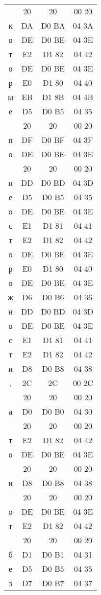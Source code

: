 \begin{center}
\begin{tabular}{|c|c|c|c|}
& 20 & 20 & 00 20\\
к & DA & D0 BA & 04 3A\\
о & DE & D0 BE & 04 3E\\
т & E2 & D1 82 & 04 42\\
о & DE & D0 BE & 04 3E\\
р & E0 & D1 80 & 04 40\\
ы & EB & D1 8B & 04 4B\\
е & D5 & D0 B5 & 04 35\\
& 20 & 20 & 00 20\\
п & DF & D0 BF & 04 3F\\
о & DE & D0 BE & 04 3E\\
& 20 & 20 & 00 20\\
н & DD & D0 BD & 04 3D\\
е & D5 & D0 B5 & 04 35\\
о & DE & D0 BE & 04 3E\\
с & E1 & D1 81 & 04 41\\
т & E2 & D1 82 & 04 42\\
о & DE & D0 BE & 04 3E\\
р & E0 & D1 80 & 04 40\\
о & DE & D0 BE & 04 3E\\
ж & D6 & D0 B6 & 04 36\\
н & DD & D0 BD & 04 3D\\
о & DE & D0 BE & 04 3E\\
с & E1 & D1 81 & 04 41\\
т & E2 & D1 82 & 04 42\\
и & D8 & D0 B8 & 04 38\\
, & 2C & 2C & 00 2C\\
& 20 & 20 & 00 20\\
а & D0 & D0 B0 & 04 30\\
& 20 & 20 & 00 20\\
т & E2 & D1 82 & 04 42\\
о & DE & D0 BE & 04 3E\\
& 20 & 20 & 00 20\\
и & D8 & D0 B8 & 04 38\\
& 20 & 20 & 00 20\\
о & DE & D0 BE & 04 3E\\
т & E2 & D1 82 & 04 42\\
& 20 & 20 & 00 20\\
б & D1 & D0 B1 & 04 31\\
е & D5 & D0 B5 & 04 35\\
з & D7 & D0 B7 & 04 37\\

\end{tabular}
\end{center}
